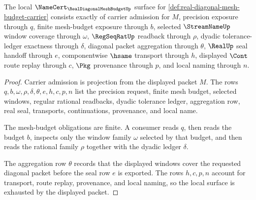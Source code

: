 \begin{theorem}
\label{thm:real-diagonal-mesh-budget-namecert-obligations}
The local $\NameCert_{\RealDiagonalMeshBudgetUp}$ surface for \autoref{def:real-diagonal-mesh-budget-carrier} consists exactly of carrier admission for $M$, precision exposure through $q$, finite mesh-budget exposure through $b$, selected $\StreamNameUp$ window coverage through $\omega$, $\RegSeqRatUp$ readback through $\rho$, dyadic tolerance-ledger exactness through $\delta$, diagonal packet aggregation through $\theta$, $\RealUp$ seal handoff through $e$, componentwise $\hsame$ transport through $h$, displayed $\Cont$ route replay through $c$, $\Pkg$ provenance through $p$, and local naming through $n$.
\end{theorem}
\begin{proof}
Carrier admission is projection from the displayed packet $M$. The rows $q,b,\omega,\rho,\delta,\theta,e,h,c,p,n$ list the precision request, finite mesh budget, selected windows, regular rational readbacks, dyadic tolerance ledger, aggregation row, real seal, transports, continuations, provenance, and local name.

The mesh-budget obligations are finite. A consumer reads $q$, then reads the budget $b$, inspects only the window family $\omega$ selected by that budget, and then reads the rational family $\rho$ together with the dyadic ledger $\delta$.

The aggregation row $\theta$ records that the displayed windows cover the requested diagonal packet before the seal row $e$ is exported. The rows $h,c,p,n$ account for transport, route replay, provenance, and local naming, so the local surface is exhausted by the displayed packet.
\end{proof}


